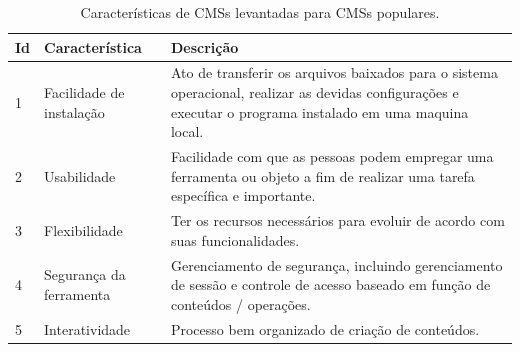 \begin{apendicesenv}
\begin{landscape}
	\begin{longtable}{|p{10pt}|p{220pt}|p{415pt}|}
 	\caption{Características de CMSs levantadas para CMSs populares.} 
 	\label{caracteristicas_CMS}\\
 	\hline
 	 {\raggedright \textbf{Id}}
 	 & {\raggedright \textbf{Característica}}
 	 & {\raggedright \textbf{Descrição}}\\
 	\hline
 	{\raggedright {1}}
 	 	 & {\raggedright {Facilidade de instalação}}
 	 	 & {\raggedright {Ato de transferir os arquivos baixados para o  sistema operacional, realizar as devidas configurações e executar o programa instalado em
 	 	 uma maquina local. \cite{costa}}}\\
 	 	\hline
 	{\raggedright {2}}
 	 	 & {\raggedright {Usabilidade}}
 	 	 & {\raggedright {Facilidade com que as pessoas podem
 	 	 empregar uma ferramenta ou objeto a fim de realizar uma tarefa específica e importante. \cite{costa}}}\\
 	 	\hline
 	{\raggedright {3}}
 	 	 & {\raggedright {Flexibilidade}}
 	 	 & {\raggedright {Ter os recursos necessários para evoluir de acordo com suas funcionalidades. \cite{Reis} }}\\
 	 	\hline
 	 	{\raggedright {4}}
 	 	 	 	 & {\raggedright {Segurança da ferramenta}}
 	 	 	 	 & {\raggedright {Gerenciamento de segurança, incluindo gerenciamento de sessão
 	 	 	 	 e controle de acesso baseado em função de conteúdos / operações. \cite{Distante2010}}}\\
 	 	 	 	\hline
 	 {\raggedright {5}}
 	  	 	 	 	 & {\raggedright {Interatividade}}
 	  	 	 	 	 & {\raggedright {Processo bem organizado de criação de conteúdos.\cite{Iliev2013}}}\\
 	  	 	 	 	\hline
 	  	 	 	 	

\end{longtable}
\end{landscape}
\end{apendicesenv}
